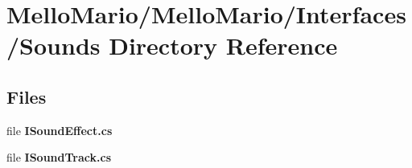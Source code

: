 \section{Mello\+Mario/\+Mello\+Mario/\+Interfaces/\+Sounds Directory Reference}
\label{dir_729d6c60f1d71351a48712b6aa85f103}
\subsection*{Files}
\begin{DoxyCompactItemize}
\item 
file \textbf{ I\+Sound\+Effect.\+cs}
\item 
file \textbf{ I\+Sound\+Track.\+cs}
\end{DoxyCompactItemize}
